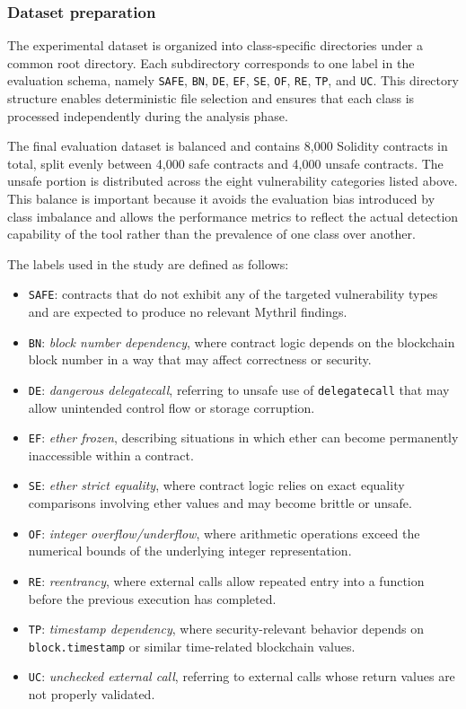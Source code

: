 \documentclass[a4paper,11pt]{article}\usepackage{graphicx} %
\begin{document}
\subsubsection{Dataset preparation}

The experimental dataset is organized into class-specific directories under a common root directory. Each subdirectory corresponds to one label in the evaluation schema, namely \texttt{SAFE}, \texttt{BN}, \texttt{DE}, \texttt{EF}, \texttt{SE}, \texttt{OF}, \texttt{RE}, \texttt{TP}, and \texttt{UC}. This directory structure enables deterministic file selection and ensures that each class is processed independently during the analysis phase.

The final evaluation dataset is balanced and contains 8{,}000 Solidity contracts in total, split evenly between 4{,}000 safe contracts and 4{,}000 unsafe contracts. The unsafe portion is distributed across the eight vulnerability categories listed above. This balance is important because it avoids the evaluation bias introduced by class imbalance and allows the performance metrics to reflect the actual detection capability of the tool rather than the prevalence of one class over another.

The labels used in the study are defined as follows:
\begin{itemize}
    \item \texttt{SAFE}: contracts that do not exhibit any of the targeted vulnerability types and are expected to produce no relevant Mythril findings.
    \item \texttt{BN}: \emph{block number dependency}, where contract logic depends on the blockchain block number in a way that may affect correctness or security.
    \item \texttt{DE}: \emph{dangerous delegatecall}, referring to unsafe use of \texttt{delegatecall} that may allow unintended control flow or storage corruption.
    \item \texttt{EF}: \emph{ether frozen}, describing situations in which ether can become permanently inaccessible within a contract.
    \item \texttt{SE}: \emph{ether strict equality}, where contract logic relies on exact equality comparisons involving ether values and may become brittle or unsafe.
    \item \texttt{OF}: \emph{integer overflow/underflow}, where arithmetic operations exceed the numerical bounds of the underlying integer representation.
    \item \texttt{RE}: \emph{reentrancy}, where external calls allow repeated entry into a function before the previous execution has completed.
    \item \texttt{TP}: \emph{timestamp dependency}, where security-relevant behavior depends on \texttt{block.timestamp} or similar time-related blockchain values.
    \item \texttt{UC}: \emph{unchecked external call}, referring to external calls whose return values are not properly validated.
\end{itemize}
\end{document}
